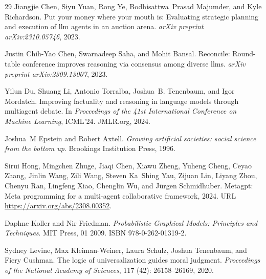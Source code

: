\begin{thebibliography}{29}
Jiangjie Chen, Siyu Yuan, Rong Ye, Bodhisattwa~Prasad Majumder, and Kyle Richardson.
\newblock Put your money where your mouth is: Evaluating strategic planning and execution of llm agents in an auction arena.
\newblock \emph{arXiv preprint arXiv:2310.05746}, 2023{}.

Justin Chih-Yao Chen, Swarnadeep Saha, and Mohit Bansal.
\newblock Reconcile: Round-table conference improves reasoning via consensus among diverse llms.
\newblock \emph{arXiv preprint arXiv:2309.13007}, 2023{}.

Yilun Du, Shuang Li, Antonio Torralba, Joshua~B. Tenenbaum, and Igor Mordatch.
\newblock Improving factuality and reasoning in language models through multiagent debate.
\newblock In \emph{Proceedings of the 41st International Conference on Machine Learning}, ICML'24. JMLR.org, 2024.

Joshua~M Epstein and Robert Axtell.
\newblock \emph{Growing artificial societies: social science from the bottom up}.
\newblock Brookings Institution Press, 1996.

Sirui Hong, Mingchen Zhuge, Jiaqi Chen, Xiawu Zheng, Yuheng Cheng, Ceyao Zhang, Jinlin Wang, Zili Wang, Steven Ka~Shing Yau, Zijuan Lin, Liyang Zhou, Chenyu Ran, Lingfeng Xiao, Chenglin Wu, and Jürgen Schmidhuber.
\newblock Metagpt: Meta programming for a multi-agent collaborative framework, 2024.
\newblock URL \url{https://arxiv.org/abs/2308.00352}.

Daphne Koller and Nir Friedman.
\newblock \emph{Probabilistic Graphical Models: Principles and Techniques}.
\newblock MIT Press, 01 2009.
\newblock ISBN 978-0-262-01319-2.

Sydney Levine, Max Kleiman-Weiner, Laura Schulz, Joshua Tenenbaum, and Fiery Cushman.
\newblock The logic of universalization guides moral judgment.
\newblock \emph{Proceedings of the National Academy of Sciences}, 117 (42): 26158--26169, 2020.


\end{thebibliography}
